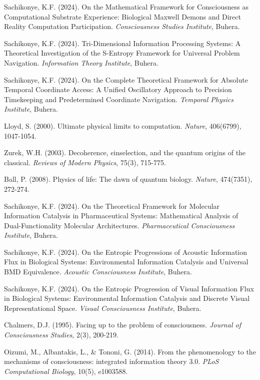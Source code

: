 \documentclass[12pt,a4paper]{article}
\theoremstyle{remark}
\begin{document}
\begin{thebibliography}{99}
Sachikonye, K.F. (2024). On the Mathematical Framework for Consciousness as Computational Substrate Experience: Biological Maxwell Demons and Direct Reality Computation Participation. \textit{Consciousness Studies Institute}, Buhera.

Sachikonye, K.F. (2024). Tri-Dimensional Information Processing Systems: A Theoretical Investigation of the S-Entropy Framework for Universal Problem Navigation. \textit{Information Theory Institute}, Buhera.

Sachikonye, K.F. (2024). On the Complete Theoretical Framework for Absolute Temporal Coordinate Access: A Unified Oscillatory Approach to Precision Timekeeping and Predetermined Coordinate Navigation. \textit{Temporal Physics Institute}, Buhera.

Lloyd, S. (2000). Ultimate physical limits to computation. \textit{Nature}, 406(6799), 1047-1054.

Zurek, W.H. (2003). Decoherence, einselection, and the quantum origins of the classical. \textit{Reviews of Modern Physics}, 75(3), 715-775.

Ball, P. (2008). Physics of life: The dawn of quantum biology. \textit{Nature}, 474(7351), 272-274.

Sachikonye, K.F. (2024). On the Theoretical Framework for Molecular Information Catalysis in Pharmaceutical Systems: Mathematical Analysis of Dual-Functionality Molecular Architectures. \textit{Pharmaceutical Consciousness Institute}, Buhera.

Sachikonye, K.F. (2024). On the Entropic Progressions of Acoustic Information Flux in Biological Systems: Environmental Information Catalysis and Universal BMD Equivalence. \textit{Acoustic Consciousness Institute}, Buhera.

Sachikonye, K.F. (2024). On the Entropic Progression of Visual Information Flux in Biological Systems: Environmental Information Catalysis and Discrete Visual Representational Space. \textit{Visual Consciousness Institute}, Buhera.

Chalmers, D.J. (1995). Facing up to the problem of consciousness. \textit{Journal of Consciousness Studies}, 2(3), 200-219.

Oizumi, M., Albantakis, L., \& Tononi, G. (2014). From the phenomenology to the mechanisms of consciousness: integrated information theory 3.0. \textit{PLoS Computational Biology}, 10(5), e1003588.

\end{thebibliography}
\end{document}
